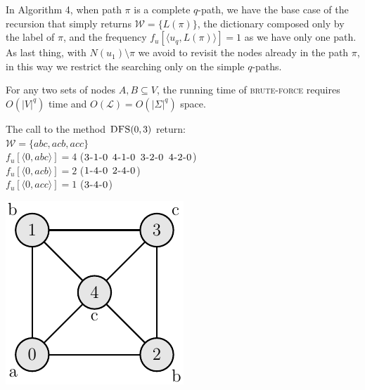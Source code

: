 	In Algorithm 4, when path $\pi$ is a complete $q$-path, we have the base case of the recursion that simply returns $\mathcal{W} = \{ L(\pi) \}$, 
	the dictionary composed only by the label of $\pi$, and the frequency $f_{u}[\langle u_{q}, L(\pi) \rangle] = 1$ as we have only one path.\\
	
	As last thing, with $N(u_{1}) \setminus \pi$ we avoid to revisit the nodes already in the path $\pi$, in this way we restrict the searching only on the simple $q$-paths.\\
	
	\begin{lemma}
		For any two sets of nodes $A, B \subseteq V$, the running time of \textsc{brute-force} requires $O(|V|^{q})$ time and $O(\mathcal{L}) = O(|\Sigma|^{q})$ space.
	\end{lemma}

	\begin{minipage}{0.6\textwidth}\raggedright
		\begin{esempio}
		\end{esempio}
		The call to the method $\textsc{DFS}(0, 3)$ return:\\
		
		$\mathcal{W} = \{ abc, acb, acc \}$\\
		$f_{u}[\langle 0, abc \rangle] = 4$ ($\textsc{3-1-0}$ $\textsc{4-1-0}$ $\textsc{3-2-0}$ $\textsc{4-2-0}$)\\
		$f_{u}[\langle 0, acb \rangle] = 2$ ($\textsc{1-4-0}$ $\textsc{2-4-0}$)\\
		$f_{u}[\langle 0, acc \rangle] = 1$ ($\textsc{3-4-0}$)\\
	\end{minipage}
	\begin{minipage}{0.35\textwidth}
		\includegraphics[width=\linewidth]{figure/figure-3-2}
	\end{minipage}
			
